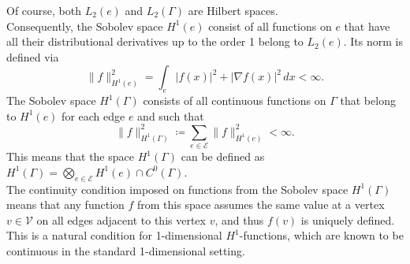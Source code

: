 Of course, both $L_2(e)$ and $L_2(\Gamma)$ are Hilbert spaces. \\
Consequently, the Sobolev space $H^1 (e)$ consist of all functions on $e$ that have all their distributional derivatives up to the order 1 belong to $L_2(e)$. Its norm is defined via
\begin{equation*}
    \lVert f \rVert^{2}_{H^1(e)} = \int_e \lvert f(x) \rvert^2 + \lvert \nabla f(x) \rvert^2 \, dx < \infty.
\end{equation*}
The Sobolev space $H^1 (\Gamma)$ consists of all continuous functions on $\Gamma$ that belong to $H^1 (e)$ for each edge $e$ and such that 
\begin{equation*} 
    \lVert f \rVert^{2}_{H^1 (\Gamma)} \coloneqq \sum_{e \in \mathcal{E}} \lVert f \rVert^{2}_{H^1 (e)} < \infty.
\end{equation*}
This means that the space $H^1 (\Gamma)$ can be defined as $H^1 (\Gamma) =  \bigotimes_{e \in \mathcal{E}} H^1 (e) \cap C^{0}(\Gamma)$.\\
The continuity condition imposed on functions from the Sobolev space $H^1 (\Gamma)$ means that any function $f$ from this space assumes the same value at a vertex $v \in \mathcal{V}$ on all edges adjacent to this vertex $v$, and thus $f(v)$ is uniquely defined. This is a natural condition for 1-dimensional $H^1$-functions, which are known to be continuous in the standard 1-dimensional setting. \\

